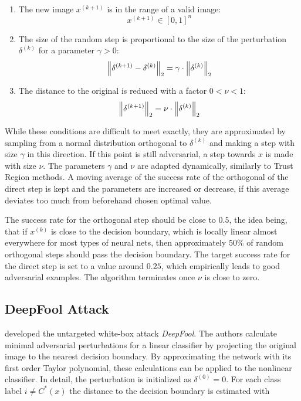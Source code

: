 \begin{enumerate}
	\item The new image $x^{(k+1)}$ is in the range of a valid image:
	\begin{equation*}
	x^{(k+1)}\in [0,1]^n
	\end{equation*}
	
	\item The size of the random step is proportional to the size of the perturbation $\delta^{(k)}$ for a parameter $\gamma > 0$:
	\begin{equation*}
	\left \lVert \delta^{(k+1)} - \delta^{(k)} \right \rVert _{2} = \gamma \cdot \left \lVert \delta^{(k)} \right \rVert _{2}
	\end{equation*}
	
	\item The distance to the original is reduced with a factor $0<\nu<1$:
	\begin{equation*}
	\left \lVert \delta^{(k+1)} \right \rVert _{2} = \nu \cdot \left \lVert \delta^{(k)} \right \rVert _{2}
	\end{equation*}
\end{enumerate}

While these conditions are difficult to meet exactly, they are approximated by sampling from a normal distribution orthogonal to $\delta^{(k)}$ and making a step with size $\gamma$ in this direction.
If this point is still adversarial, a step towards $x$ is made with size $\nu$.
The parameters $\gamma$ and $\nu$ are adapted dynamically, similarly to Trust Region methods.
A moving average of the success rate of the orthogonal of the direct step is kept and the parameters are increased or decrease, if this average deviates too much from beforehand chosen optimal value.

The success rate for the orthogonal step should be close to $0.5$, the idea being, that if $x^{(k)}$ is close to the decision boundary, which is locally linear almost everywhere for most types of neural nets, then approximately $50\%$ of random orthogonal steps should pass the decision boundary. 
The target success rate for the direct step is set to a value around $0.25$, which empirically leads to good adversarial examples.
The algorithm terminates once $\nu$ is close to zero.

\subsection{DeepFool Attack}

\citet{deepfool} developed the untargeted white-box attack \emph{DeepFool}.
The authors calculate minimal adversarial perturbations for a linear classifier by projecting the original image to the nearest decision boundary.
By approximating the network with its first order Taylor polynomial, these calculations can be applied to the nonlinear classifier.
In detail, the perturbation is initialized as $\delta^{(0)} = 0$.
For each class label $i \neq C^*(x)$ the distance to the decision boundary is estimated with

